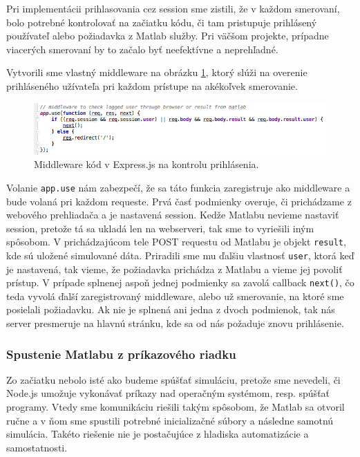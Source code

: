 Pri implementácii prihlasovania cez session sme zistili, že v každom smerovaní, bolo potrebné kontrolovať na začiatku kódu, či tam pristupuje prihlásený používateľ alebo požiadavka z Matlab služby. Pri väčšom projekte, prípadne viacerých smerovaní by to začalo byť neefektívne a neprehľadné. 

Vytvorili sme vlastný middleware na obrázku \ref{img-code-express-middleware}, ktorý slúži na overenie prihláseného užívateľa pri každom prístupe na akékoľvek smerovanie.

\begin{figure}[H]
  \centering
  \includegraphics[scale=0.6]{img/code/express-middleware.png}
  \caption{Middleware kód v Express.js na kontrolu prihlásenia.}
  \label{img-code-express-middleware}
\end{figure}

Volanie \verb|app.use| nám zabezpečí, že sa táto funkcia zaregistruje ako middleware a bude volaná pri každom requeste. Prvá časť podmienky overuje, či prichádzame z webového prehliadača a je nastavená session. Kedže Matlabu nevieme nastaviť session, pretože tá sa ukladá len na webserveri, tak sme to vyriešili iným spôsobom. V prichádzajúcom tele POST requestu od Matlabu je objekt \verb|result|, kde sú uložené simulované dáta. Priradili sme mu ďalšiu vlastnosť \verb|user|, ktorá keď je nastavená, tak vieme, že požiadavka prichádza z Matlabu a vieme jej povoliť prístup. V prípade splnenej aspoň jednej podmienky sa zavolá callback \verb|next()|, čo teda vyvolá ďalší zaregistrovaný middleware, alebo už smerovanie, na ktoré sme posielali požiadavku.
Ak nie je splnená ani jedna z dvoch podmienok, tak nás server presmeruje na hlavnú stránku, kde sa od nás požaduje znovu prihlásenie.


\subsubsection{Spustenie Matlabu z príkazového riadku}
Zo začiatku nebolo isté ako budeme spúšťať simuláciu, pretože sme nevedeli, či Node.js umožuje vykonávať príkazy nad operačným systémom, resp. spúšťať programy. Vtedy sme komunikáciu riešili takým spôsobom, že Matlab sa otvoril ručne a v ňom sme spustili potrebné inicializačné súbory a následne samotnú simulácia. Takéto riešenie nie je postačujúce z hladiska automatizácie a samostatnosti.


